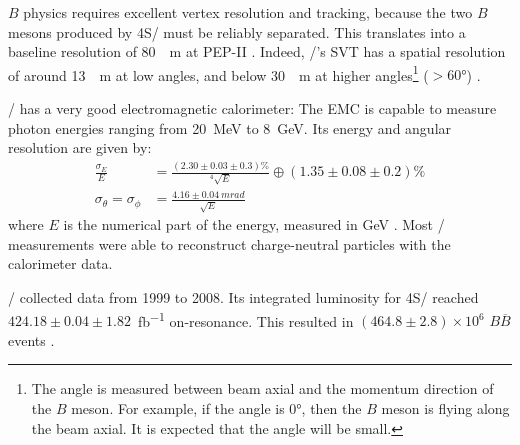 $B$ physics requires excellent vertex resolution and tracking, because the two
$B$ mesons produced by \Y4S/ must be reliably separated.
This translates into a baseline resolution of \SI{80}{\mu m} at
PEP-II \cite{Harrison:1998yr}.
Indeed, \BaBar/'s SVT has a spatial resolution of around \SI{13}{\mu m} at low
angles, and below \SI{30}{\mu m} at higher angles\footnote{
    The angle is measured between beam axial and the momentum direction of the
    $B$ meson.
    For example, if the angle is \ang{0}, then the $B$ meson is flying along the
    beam axial.
    It is expected that the angle will be small.
}
($> \ang{60}$) \cite{Harrison:1998yr}.

\BaBar/ has a very good electromagnetic calorimeter:
The EMC is capable to measure photon energies ranging from \SI{20}{MeV} to
\SI{8}{GeV}.
Its energy and angular resolution are given by:
\begin{align*}
    \frac{\sigma_E}{E} &= \frac{(2.30 \pm 0.03 \pm 0.3)\%}{^{4}\sqrt{E}}
    \oplus (1.35 \pm 0.08 \pm 0.2)\% \\
    \sigma_{\theta} = \sigma_{\phi} &= \frac{{4.16 \pm 0.04}~\si{mrad}}
        {\sqrt{E}}
\end{align*}
where $E$ is the numerical part of the energy, measured in
\si{GeV} \cite{Bauer:2005}.
Most \BaBar/ measurements were able to reconstruct charge-neutral particles with
the calorimeter data.

\BaBar/ collected data from 1999 to 2008. Its integrated luminosity for \Y4S/
reached $424.18 \pm 0.04 \pm 1.82$~\si{fb^{-1}} on-resonance.
This resulted in $(464.8 \pm 2.8) \times 10^6$ $B \overline{B}$
events \cite{Lees:2013rw}.
